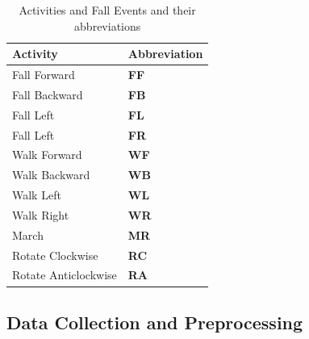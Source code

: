 \documentclass{IEEEtran}
\begin{document}
\begin{table}[htb]
\caption{Activities and Fall Events and their abbreviations}
{
\begin{tabular}{|l|l|}
\hline \hline
\textbf{Activity} & \textbf{Abbreviation} \\  \hline
Fall Forward &\textbf{FF} \\ \hline
Fall Backward &\textbf{FB}  \\ \hline
Fall Left &\textbf{FL}  \\ \hline
Fall Left &\textbf{FR}  \\ \hline
Walk Forward &\textbf{WF} \\ \hline
Walk Backward &\textbf{WB} \\ \hline
Walk Left &\textbf{WL} \\ \hline
Walk Right &\textbf{WR}  \\ \hline
March &\textbf{MR}  \\ \hline
Rotate Clockwise &\textbf{RC} \\ \hline
Rotate Anticlockwise&\textbf{RA}  \\ \hline
\end{tabular}
}
\label{Tbl:ListOfActivities}
\end{table}
 


\subsection{Data Collection and Preprocessing  }
\label{subsec:preDataCollection}
\end{document}
